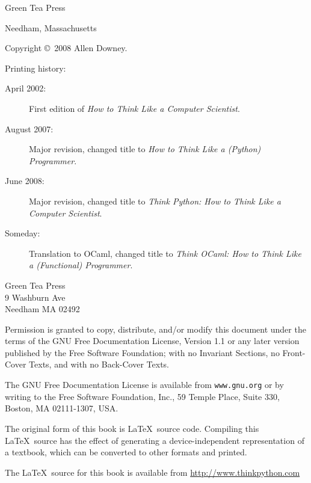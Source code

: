 \documentclass[10pt]{book}
\begin{document}
\begin{latexonly}
\begin{flushright}
\vspace{0.5in}

{\Large Green Tea Press}

{\small Needham, Massachusetts}

\vfill

\end{flushright}


\pagebreak
\thispagestyle{empty}

{\small
Copyright \copyright ~2008 Allen Downey.


Printing history:

\begin{description}

\item[April 2002:] First edition of {\em How to Think Like
a Computer Scientist}.

\item[August 2007:] Major revision, changed title to
{\em How to Think Like a (Python) Programmer}.

\item[June 2008:] Major revision, changed title to
{\em Think Python: How to Think Like
a Computer Scientist}.

\item[Someday:] Translation to OCaml, changed title to
{\em Think OCaml: How to Think Like a (Functional) Programmer}.

\end{description}

\vspace{0.2in}

\begin{flushleft}
Green Tea Press       \\
9 Washburn Ave \\
Needham MA 02492
\end{flushleft}

Permission is granted to copy, distribute, and/or modify this document
under the terms of the GNU Free Documentation License, Version 1.1 or
any later version published by the Free Software Foundation; with no
Invariant Sections, no Front-Cover Texts, and with no Back-Cover Texts.

The GNU Free Documentation License is available from {\tt www.gnu.org}
or by writing to the Free Software Foundation, Inc., 59 Temple Place,
Suite 330, Boston, MA 02111-1307, USA.

The original form of this book is \LaTeX\ source code.  Compiling this
\LaTeX\ source has the effect of generating a device-independent
representation of a textbook, which can be converted to other formats
and printed.

The \LaTeX\ source for this book is available from
\url{http://www.thinkpython.com}

\vspace{0.2in}

} %

\end{latexonly}
\end{document}

